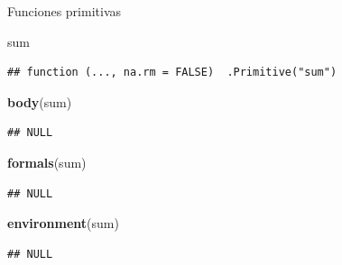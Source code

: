 \documentclass[ignorenonframetext,]{beamer}
\newenvironment{Shaded}{\begin{snugshade}}{\end{snugshade}}
\newcommand{\KeywordTok}[1]{\textcolor[rgb]{0.13,0.29,0.53}{\textbf{#1}}}
\newcommand{\NormalTok}[1]{#1}
\begin{document}
\begin{frame}[fragile]{Funciones primitivas}
\protect\hypertarget{funciones-primitivas}{}

\begin{Shaded}
\begin{Highlighting}[]
\NormalTok{sum}
\end{Highlighting}
\end{Shaded}

\begin{verbatim}
## function (..., na.rm = FALSE)  .Primitive("sum")
\end{verbatim}

\begin{Shaded}
\begin{Highlighting}[]
\KeywordTok{body}\NormalTok{(sum)}
\end{Highlighting}
\end{Shaded}

\begin{verbatim}
## NULL
\end{verbatim}

\begin{Shaded}
\begin{Highlighting}[]
\KeywordTok{formals}\NormalTok{(sum)}
\end{Highlighting}
\end{Shaded}

\begin{verbatim}
## NULL
\end{verbatim}

\begin{Shaded}
\begin{Highlighting}[]
\KeywordTok{environment}\NormalTok{(sum)}
\end{Highlighting}
\end{Shaded}

\begin{verbatim}
## NULL
\end{verbatim}

\end{frame}
\end{document}
